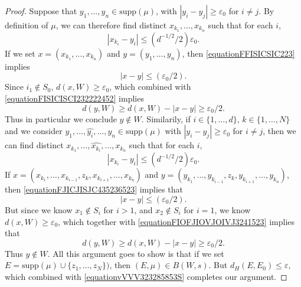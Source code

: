 \documentclass[12pt,reqno]{article}
\numberwithin{equation}{section}
\begin{document}
\begin{proof}
    Suppose that $y_1, \dots, y_n \in \text{supp}(\mu)$, with $|y_i - y_j| \geq \varepsilon_0$ for $i \neq j$. By definition of $\mu$, we can therefore find distinct $x_{k_1}, \dots, x_{k_n}$ such that for each $i$,
    \begin{equation} \label{equationFFISICSIC223}
        |x_{k_i} - y_i| \leq (d^{-1/2}/2) \varepsilon_0.
    \end{equation}
    If we set $x = (x_{k_1}, \dots, x_{k_n})$ and $y = (y_1, \dots, y_n)$, then \eqref{equationFFISICSIC223} implies
    \begin{equation} \label{equationFISICISCI232222452}
        |x - y| \leq (\varepsilon_0/2).
    \end{equation}
    Since $i_1 \not \in S_0$, $d(x,W) \geq \varepsilon_0$, which combined with \eqref{equationFISICISCI232222452} implies
    \begin{equation} \label{equationSICSICI}
        d(y,W) \geq d(x,W) - |x - y| \geq \varepsilon_0/2.
    \end{equation}
    Thus in particular we conclude $y \not \in W$. Similarily, if $i \in \{ 1, \dots, d \}$, $k \in \{ 1, \dots, N \}$ and we consider $y_1, \dots, \widehat{y_i}, \dots, y_n \in \text{supp}(\mu)$ with $|y_i - y_j| \geq \varepsilon_0$ for $i \neq j$, then we can find distinct $x_{k_1}, \dots, \widehat{x_{k_i}}, \dots, x_{k_n}$ such that for each $i$,
    \begin{equation} \label{equationFJICJISJC435236523}
        |x_{k_i} - y_i| \leq (d^{-1/2}/2) \varepsilon_0.
    \end{equation}
    If $x = (x_{k_1}, \dots, x_{k_{i-1}}, z_k, x_{k_{i+1}}, \dots, x_{k_n})$ and $y = (y_{k_1}, \dots, y_{k_{i-1}}, z_k, y_{k_{i+1}}, \dots, y_{k_n})$, then \eqref{equationFJICJISJC435236523} implies that
    \begin{equation} \label{equationFIOFJIOVJOIVJ3241523}
        |x - y| \leq (\varepsilon_0/2).
    \end{equation}
    But since we know $x_1 \not \in S_i$ for $i > 1$, and $x_2 \not \in S_i$ for $i = 1$, we know $d(x,W) \geq \varepsilon_0$, which together with \eqref{equationFIOFJIOVJOIVJ3241523} implies that
    \begin{equation} \label{equationZSIDOSIDJOI}
        d(y,W) \geq d(x,W) - |x - y| \geq \varepsilon_0/2.
    \end{equation}
    Thus $y \not \in W$. All this argument goes to show is that if we set $E = \text{supp}(\mu) \cup \{ z_1, \dots, z_N \})$, then $(E,\mu) \in B(W,s)$. But $d_H(E,E_0) \leq \varepsilon$, which combined with \eqref{equationvVVV323285853S} completes our argument.
\end{proof}
\end{document}
